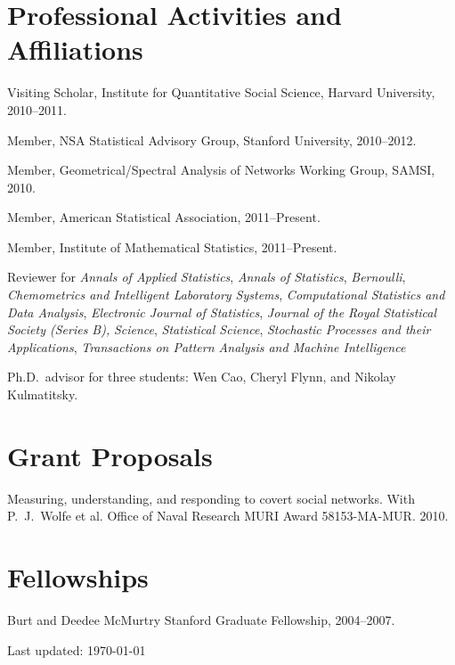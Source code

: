 \documentclass[10pt,letterpaper]{article}
\renewenvironment{itemize}{
  \begin{list}{}{
    \setlength{\leftmargin}{1.5em}
    \setlength{\itemsep}{0.25em}
    \setlength{\parskip}{0pt}
    \setlength{\parsep}{0.25em}
  }
}{
  \end{list}
}
\begin{document}
\section*{Professional Activities and Affiliations}
\begin{itemize}
\item Visiting Scholar, Institute for Quantitative Social Science, Harvard University, 2010--2011.
\item Member, NSA Statistical Advisory Group, Stanford University, 2010--2012.
\item Member, Geometrical/Spectral Analysis of Networks Working Group, SAMSI, 2010.
\item Member, American Statistical Association, 2011--Present.
\item Member, Institute of Mathematical Statistics, 2011--Present.
\item Reviewer for
  \textit{Annals of Applied Statistics},
  \textit{Annals of Statistics},
  \textit{Bernoulli},
  \textit{Chemometrics and Intelligent Laboratory Systems},
  \textit{Computational Statistics and Data Analysis},
  \textit{Electronic Journal of Statistics},
  \textit{Journal of the Royal Statistical Society (Series B),}
  \textit{Science},
  \textit{Statistical Science},
  \textit{Stochastic Processes and their Applications},
  \textit{Transactions on Pattern Analysis and Machine Intelligence}
\item Ph.D.~advisor for three students: Wen Cao, Cheryl Flynn, and Nikolay Kulmatitsky.
\end{itemize}




\section*{Grant Proposals}
\begin{itemize}
  \item Measuring, understanding, and responding to covert social networks.
  With P.~J.~Wolfe et al.
  Office of Naval Research MURI Award 58153-MA-MUR.
  2010.
\end{itemize}




\section*{Fellowships}

\begin{itemize}
\item Burt and Deedee McMurtry Stanford Graduate Fellowship, 2004--2007.
\end{itemize}

\medskip

\begin{center}
  \begin{small}
    Last updated: \today
  \end{small}
\end{center}


\end{document}
